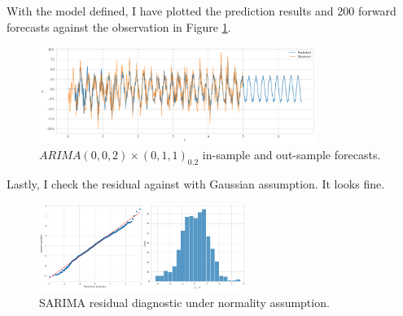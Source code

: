 \documentclass[11pt, letterpaper]{article}
\begin{document}
With the model defined, I have plotted the prediction results and 200 forward forecasts against the observation in Figure \ref{fig:sarima_forecast}.
\begin{figure}[!h]
  \centering
  \includegraphics[width=0.8\textwidth]{plot5.png}
  \captionsetup{justification=centering}
  \caption{$ARIMA(0,0,2) \times (0,1,1)_{0.2}$ in-sample and out-sample forecasts.}
  \label{fig:sarima_forecast}
\end{figure}

Lastly, I check the residual against with Gaussian assumption. It looks fine.
\begin{figure}[!h]
  \centering
  \includegraphics[width=0.6\textwidth]{plot6.png}
  \captionsetup{justification=centering}
  \caption{SARIMA residual diagnostic under normality assumption.}
  \label{fig:sarima_diagnostic}
\end{figure}

\newpage
\end{document}
